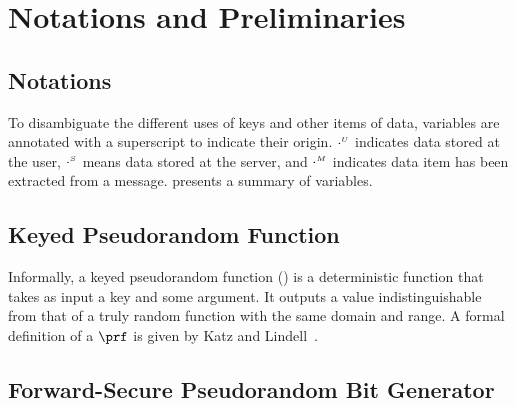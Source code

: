 
\section{Notations and Preliminaries}

 \subsection{Notations}
  
 To disambiguate the different uses of keys and other items of data, variables are annotated with a superscript to indicate their origin. $\cdot^{\scriptscriptstyle U}$ indicates data stored at the user, $\cdot^{\scriptscriptstyle S}$ means data stored at the server, and $\cdot^{\scriptscriptstyle M}$ indicates data item has been extracted from a message.  presents  a summary of variables.
 
 

\subsection{Keyed Pseudorandom Function}\label{subsec:PRF}

Informally, a keyed pseudorandom function (\prf) is a deterministic function that takes as input a key and some argument. It outputs a value indistinguishable from that of a truly random function with the same domain and range.  A formal definition of a $\prf$ is given by Katz and Lindell~\cite{KatzLindell2014}.%

\subsection{Forward-Secure Pseudorandom Bit Generator}

